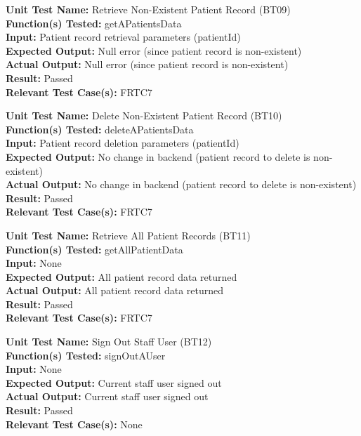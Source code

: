 \documentclass[12pt, titlepage]{article}
\begin{document}
\begin{mdframed}[linewidth=0.5mm]
  \textbf{Unit Test Name:} Retrieve Non-Existent Patient Record (BT09) \\
  \textbf{Function(s) Tested:} getAPatientsData \\
  \textbf{Input:} Patient record retrieval parameters (patientId) \\
  \textbf{Expected Output:} Null error (since patient record is non-existent) \\
  \textbf{Actual Output:} Null error (since patient record is non-existent) \\
  \textbf{Result:} Passed \\
  \textbf{Relevant Test Case(s):} FRTC7
\end{mdframed}

\begin{mdframed}[linewidth=0.5mm]
  \textbf{Unit Test Name:} Delete Non-Existent Patient Record (BT10) \\
  \textbf{Function(s) Tested:} deleteAPatientsData \\
  \textbf{Input:} Patient record deletion parameters (patientId) \\
  \textbf{Expected Output:} No change in backend (patient record to delete is non-existent) \\
  \textbf{Actual Output:} No change in backend (patient record to delete is non-existent) \\
  \textbf{Result:} Passed \\
  \textbf{Relevant Test Case(s):} FRTC7
\end{mdframed}

\begin{mdframed}[linewidth=0.5mm]
  \textbf{Unit Test Name:} Retrieve All Patient Records (BT11) \\
  \textbf{Function(s) Tested:} getAllPatientData \\
  \textbf{Input:} None \\
  \textbf{Expected Output:} All patient record data returned \\
  \textbf{Actual Output:} All patient record data returned \\
  \textbf{Result:} Passed \\
  \textbf{Relevant Test Case(s):} FRTC7
\end{mdframed}

\begin{mdframed}[linewidth=0.5mm]
  \textbf{Unit Test Name:} Sign Out Staff User (BT12) \\
  \textbf{Function(s) Tested:} signOutAUser \\
  \textbf{Input:} None \\
  \textbf{Expected Output:} Current staff user signed out \\
  \textbf{Actual Output:} Current staff user signed out \\
  \textbf{Result:} Passed \\
  \textbf{Relevant Test Case(s):} None
\end{mdframed}
\end{document}
